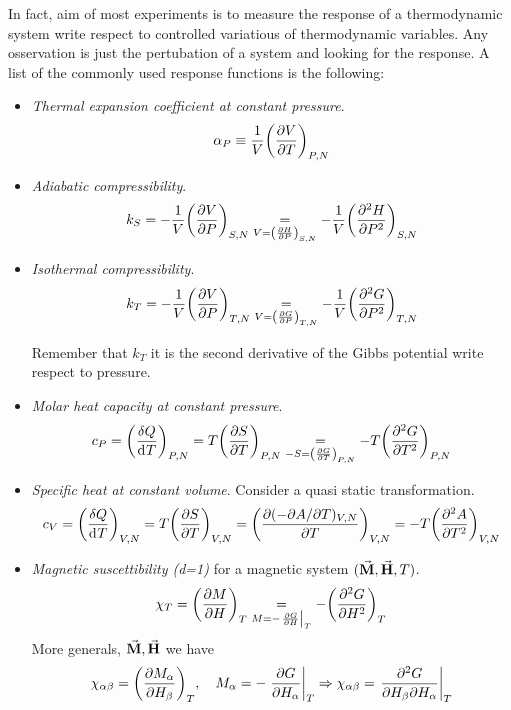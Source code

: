 \documentclass[../main/main.tex]{subfiles}
\begin{document}
In fact, aim of most experiments is to measure the response of a thermodynamic system write respect to controlled variatious of thermodynamic variables. Any osservation is just the pertubation of a system and looking for the response.
A list of the commonly used response functions is the following:
\begin{itemize}
\item \emph{Thermal expansion coefficient at constant pressure}.
\begin{equation}
  \alpha _P \equiv \frac{1}{V} \qty(\pdv{V}{T} )_{P,N}
  \label{eq:}
\end{equation}
\item \emph{Adiabatic compressibility}.
\begin{equation}
  k_S = -\frac{1}{V} \qty(\pdv{V}{P} )_{S,N} \underset{V=\qty(\pdv{H}{P} )_{S,N} }{=} - \frac{1}{V} \qty(\pdv[2]{H}{P} )_{S,N}
    \label{eq:}
\end{equation}
\item \emph{Isothermal compressibility}.
\begin{equation}
  k_T = -\frac{1}{V} \qty(\pdv{V}{P} )_{T,N} \underset{V=\qty(\pdv{G}{P} )_{T,N} }{=} - \frac{1}{V} \qty(\pdv[2]{G}{P} )_{T,N}
  \label{eq:}
\end{equation}
\begin{remark}
Remember that \( k_T \) it is the second derivative of the Gibbs potential write respect to pressure.
\end{remark}
\item \emph{Molar heat capacity at constant pressure}.
\begin{equation}
  c_P = \qty(\frac{\delta Q}{\dd[]{T} } )_{P,N} = T \qty(\pdv{S}{T} )_{P,N} \underset{-S=\qty(\pdv{G}{T} )_{P,N} }{=}  - T \qty(\pdv[2]{G}{T} )_{P,N}
  \label{eq:}
\end{equation}
\item \emph{Specific heat at constant volume}. Consider a quasi static transformation.
\begin{equation}
  c_V =  \qty(\frac{\delta Q}{\dd[]{T} } )_{V,N} = T \qty(\pdv{S}{T} )_{V,N}
      = \qty( \frac{\partial{(-\partial{A}/\partial{T} )_{V,N}} }{\partial{T} })_{V,N}
      = - T \qty(\pdv[2]{A}{T} )_{V,N}
  \label{eq:}
\end{equation}
\item \emph{Magnetic suscettibility (d=1)} for a magnetic system \( (\va{M},\va{H},T  ) \).
\begin{equation}
  \chi_T = \qty(\pdv{M}{H} )_T \underset{M = -\eval{\pdv{G}{H}}_T }{=}  - \qty(\pdv[2]{G}{H} )_T
  \label{eq:}
\end{equation}
More generals, \( \va{M},\va{H}   \) we have
\begin{equation}
  \chi _{\alpha \beta } = \qty(\pdv{M_ \alpha }{H_ \beta } )_T , \quad M_ \alpha = -\eval{\pdv{G}{H_ \alpha }}_T \Rightarrow \chi _{\alpha \beta } = \eval{\pdv{G}{H_ \beta }{H_ \alpha }}_T
  \label{eq:}
\end{equation}

\end{itemize}
\end{document}
